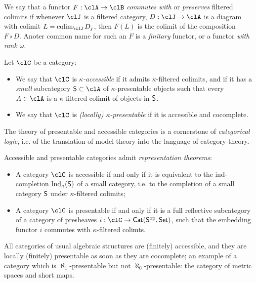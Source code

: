 We say that a functor $F : \clA \to \clB$ \emph{commutes with} or \emph{preserves} filtered colimits if whenever $\clJ$ is a filtered category, $D : \clJ \to \clA$ is a diagram with colimit $L=\colim_\clJ D_j$, then $F(L)$ is the colimit of the composition $F\circ D$. Anoter common name for such an $F$ is a \emph{finitary} functor, or a functor \emph{with rank $\omega$}.
\begin{definition}\label{accepre}
  Let $\clC$ be a category;
  \begin{itemize}
    \item We say that $\clC$ is \emph{$\kappa$\hyp{}accessible} if it admits $\kappa$\hyp{}filtered colimits, and if it has a \emph{small} subcategory $\cate{S}\subset \clA$ of $\kappa$\hyp{}presentable objects such that every $A\in\clA$ is a $\kappa$\hyp{}filtered colimit of objects in $\mathsf{S}$.
    \item We say that $\clC$ is \emph{(locally) $\kappa$\hyp{}presentable} if it is accessible and cocomplete.
  \end{itemize}
  The theory of presentable and accessible categories is a cornerstone of \emph{categorical logic}, i.e. of the translation of model theory into the language of category theory.

  Accessible and presentable categories admit \emph{representation theorems}:
  \begin{itemize}
    \item A category $\clC$ is accessible if and only if it is equivalent to the ind\hyp{}completion $\text{Ind}_\kappa(\mathsf{S})$ of a small category, i.e. to the completion of a small category $\mathsf{S}$ under  $\kappa$\hyp{}filtered colimits;
    \item A category $\clC$ is presentable if and only if it is a full reflective subcategory of a category of presheaves $i : \clC \to \Cat(\cate{S}^\op,\Set)$, such that the embedding functor $i$ commutes with $\kappa$\hyp{}filtered colimts.
  \end{itemize}
\end{definition}
All categories of usual algebraic structures are (finitely) accessible, and they are locally (finitely) presentable as soon as they are cocomplete; an example of a category which is $\aleph_1$\hyp{}presentable but not $\aleph_0$\hyp{}presentable: the category of metric spaces and short maps.
